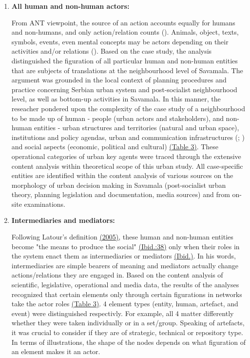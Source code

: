 \documentclass[11pt]{report}
\begin{document}
\begin{enumerate}
\item \textbf{All human and non-human actors:}

From ANT viewpoint, the source of an action accounts equally for humans and non-humans, and only action/relation counts (\cite{Latour 1996}). Animals, object, texts, symbols, events, even mental concepts may be actors depending on their activities and/or relations (\cite{Cerulo 2009}).
Based on the case study, the analysis distinguished the figuration of all particular human and non-human entities that are subjects of translations at the neighbourhood level of Savamala. The argument was grounded in the local context of planning procedures and practice concerning Serbian urban system and post-socialist neighbourhood level, as well as bottom-up activities in Savamala. In this manner, the reseacher pondered upon the complexity of the case study of a neighbourhood to be made up of human - people (urban actors and stakeholders), and non-human entities - urban structures and territories (natural and urban space), institutions and policy agendas, urban and communication infrastructures (\cite{Mitchell 1999}; \cite{Firmino et al., 2008}) and social aspects (economic, political and cultural) \href{ref}{(Table 3)}. These operational categories of urban key agents were traced through the extensive content analysis within theoretical scope of this urban study. All case-specific entities are identified within the content analysis of various sources on the morphology of urban decision making in Savamala (post-socialist urban theory, planning legislation and documentation, media sources) and from on-site examinations.

\item \textbf{Intermediaries and mediators:}

Following Latour’s definition \href{ref}{(2005)}, these human and non-human entities become "the means to produce the social" \href{ref}{(Ibid.:38)} only when their roles in the system enact them as intermediaries or mediators \href{ref}{(Ibid.)}. In his words, intermediaries are simple bearers of meaning and mediators actually change actions/relations they are engaged in.
Based on the content analysis of scientific, legislative, operational and media data, the results of the analyses recognized that certain elements only through certain figurations in networks take the actor roles \href{ref}{(Table 3)}. 4 element types (entity, human, artefact, and event) were distinguished respectivly. For example, all 4 matter differently whether they were taken individually or in a set/group. Speaking of artefacts, it was crucial to consider if they are of strategic, technical or repository type. In terms of illustrations, the shape of the nodes depends on what figuration of an element makes it an actor.


\end{enumerate}
\end{document}
